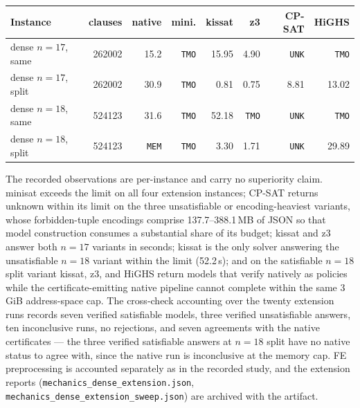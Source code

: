 \documentclass[11pt]{article}
\theoremstyle{plain}
\theoremstyle{definition}
\theoremstyle{remark}
\begin{document}
\begin{center}
\footnotesize
\begin{tabular}{@{}lrrrrrrr@{}}
\toprule
Instance & clauses & native & mini. & kissat & z3 & CP-SAT & HiGHS\\
\midrule
dense \(n{=}17\), same & 262002 & 15.2 & \texttt{TMO} & 15.95 & 4.90 & \texttt{UNK} & \texttt{TMO}\\
dense \(n{=}17\), split & 262002 & 30.9 & \texttt{TMO} & 0.81 & 0.75 & 8.81 & 13.02\\
dense \(n{=}18\), same & 524123 & 31.6 & \texttt{TMO} & 52.18 & \texttt{TMO} & \texttt{UNK} & \texttt{TMO}\\
dense \(n{=}18\), split & 524123 & \texttt{MEM} & \texttt{TMO} & 3.30 & 1.71 & \texttt{UNK} & 29.89\\
\bottomrule
\end{tabular}
\label{tab:dense-extension}
\end{center}

The recorded observations are per-instance and carry no superiority claim.
minisat exceeds the limit on all four extension instances; CP-SAT returns
unknown within its limit on the three unsatisfiable or encoding-heaviest
variants, whose forbidden-tuple encodings comprise 137.7--388.1\,MB of JSON
so that model construction consumes a substantial share of its budget;
kissat and z3 answer both \(n{=}17\) variants in seconds; kissat is the
only solver answering the unsatisfiable \(n{=}18\) variant within the limit
(52.2\,s); and on the satisfiable \(n{=}18\) split variant kissat, z3, and
HiGHS return models that verify natively as policies while the
certificate-emitting native pipeline cannot complete within the same
3\,GiB address-space cap.  The cross-check accounting over the twenty
extension runs records seven verified satisfiable models, three verified
unsatisfiable answers, ten inconclusive runs, no rejections, and seven
agreements with the native certificates --- the three verified
satisfiable answers at \(n{=}18\) split have no native status to agree
with, since the native run is inconclusive at the memory cap.  FE
preprocessing is accounted separately as in the recorded study, and the
extension reports
(\texttt{mechanics\_dense\_extension.json}, \\
\texttt{mechanics\_dense\_extension\_sweep.json}) are archived with the
artifact.
\end{document}
